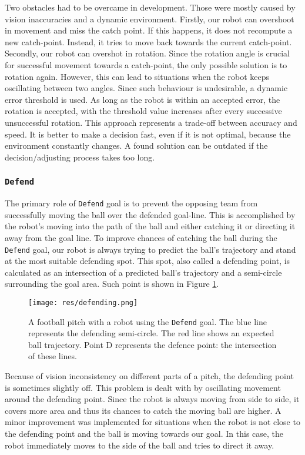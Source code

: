 Two obstacles had to be overcame in development. Those were mostly caused by
vision inaccuracies and a dynamic environment. Firstly, our robot can overshoot
in movement and miss the catch point. If this happens, it does not recompute a
new catch-point. Instead, it tries to move back towards the current
catch-point. Secondly, our robot can overshot in rotation. Since the rotation
angle is crucial for successful movement towards a catch-point, the only
possible solution is to rotation again. However, this can lead to situations
when the robot keeps oscillating between two angles. Since such behaviour is
undesirable, a dynamic error threshold is used. As long as the robot is within
an accepted error, the rotation is accepted, with the threshold value increases
after every successive unsuccessful rotation. This approach represents a
trade-off between accuracy and speed. It is better to make a decision fast,
even if it is not optimal, because the environment constantly changes. A found
solution can be outdated if the decision/adjusting process takes too long.

\subsubsection{\texttt{Defend}}

The primary role of \texttt{Defend} goal is to prevent the opposing team from
successfully moving the ball over the defended goal-line. This is accomplished
by the robot's moving into the path of the ball and either catching it or
directing it away from the goal line. To improve chances of catching the ball
during the \texttt{Defend} goal, our robot is always trying to predict the
ball's trajectory and stand at the most suitable defending spot. This spot,
also called a defending point, is calculated as an intersection of a predicted
ball's trajectory and a semi-circle surrounding the goal area. Such point is
shown in Figure \ref{fig:defendingpoint}.

\begin{figure}[H]
	\begin{center}
    \texttt{[image: res/defending.png]}
    \caption{A football pitch with a robot using the \texttt{Defend} goal. The blue line represents the defending semi-circle. The red line shows an expected ball trajectory. Point D represents the defence point: the intersection of these lines.}
    \label{fig:defendingpoint}
	\end{center}
\end{figure}

Because of vision inconsistency on different parts of a pitch, the defending
point is sometimes slightly off. This problem is dealt with by oscillating
movement around the defending point. Since the robot is always moving from side
to side, it covers more area and thus its chances to catch the moving ball are
higher. A minor improvement was implemented for situations when the robot is not
close to the defending point and the ball is moving towards our goal. In this
case, the robot immediately moves to the side of the ball and tries to direct
it away.
